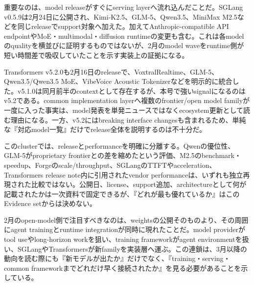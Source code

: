 重要なのは、model releaseがすぐにserving layerへ流れ込んだことだ。SGLang v0.5.9は2月24日に公開され、Kimi-K2.5、GLM-5、Qwen3.5、MiniMax M2.5などを同じreleaseでsupport対象へ加えた。加えてAnthropic-compatible API endpointやMoE・multimodal・diffusion runtimeの変更も含む。これは各modelのqualityを横並びに証明するものではないが、2月のmodel waveをruntime側が短い時間差で吸収していたことを示す実装上の証拠になる。\autocite{src-5bc0746a47c6}


Transformers v5.2.0も2月16日のreleaseで、VoxtralRealtime、GLM-5、Qwen3.5/Qwen3.5 MoE、VibeVoice Acoustic Tokenizerなどを明示的に統合した。v5.1.0は同月前半のcontextとして存在するが、本号で強いsignalになるのはv5.2である。common implementation layerへ複数のfrontier/open model familyが一度に入った事実は、model発表を単発ニュースではなくecosystem更新として読む理由になる。一方、v5.2にはbreaking interface changesも含まれるため、単純な『対応model一覧』だけでrelease全体を説明するのは不十分だ。\autocite{src-0bd04783f97b,src-a43d64987293}


\begin{claimboundary}
このclusterでは、releaseとperformanceを明確に分離する。Qwenの優位性、GLM-5がproprietary frontierとの差を縮めたという評価、M2.5のbenchmark・speedup、Forgeのscale/throughput、SGLangのTTFTやacceleration、Transformers release note内に引用されたvendor performanceは、いずれも独立再現された比較ではない。公開日、license、support追加、architectureとして何が記載されたかは一次資料で固定できるが、『どれが最も優れているか』はこのEvidence setからは決めない。\autocite{src-5bc0746a47c6,src-9156c37fb1c2,src-a43d64987293,src-d8e13386974c,src-eac8dfbeb78c}
\end{claimboundary}

2月のopen-model側で注目すべきなのは、weightsの公開そのものより、その周囲にagent trainingとruntime integrationが同時に現れたことだ。model providerがtool useやlong-horizon workを狙い、training frameworkがagent environmentを扱い、SGLangやTransformersが新familyを実装層へ運ぶ。この連鎖は、3月以降の動向を読む際にも『新モデルが出たか』だけでなく、『training・serving・common frameworkまでどれだけ早く接続されたか』を見る必要があることを示している。\autocite{src-5bc0746a47c6,src-a43d64987293,src-d8e13386974c}
